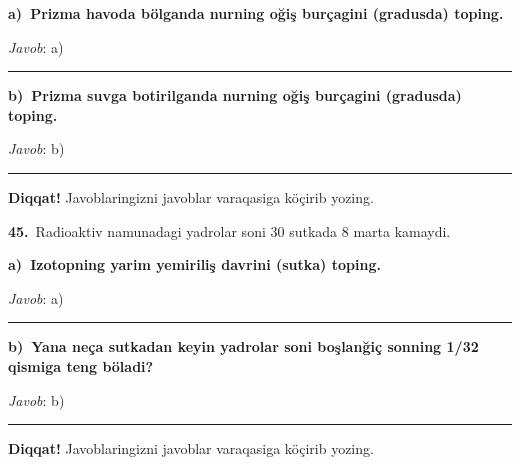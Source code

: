 \documentclass[11pt,a4paper]{article}
\newcommand{\blank}{\rule{5cm}{0.4pt}}
\begin{document}
\medskip\noindent\textbf{a)\ Prizma havoda bölganda nurning oğiş burçagini (gradusda) toping.}\par
\noindent\textit{Javob}: a)\ \blank\par
\medskip\noindent\textbf{b)\ Prizma suvga botirilganda nurning oğiş burçagini (gradusda) toping.}\par
\noindent\textit{Javob}: b)\ \blank\par
\medskip\noindent\textbf{Diqqat!} Javoblaringizni javoblar varaqasiga köçirib yozing.\par\vspace{10pt}
\noindent\textbf{45.}\ Radioaktiv namunadagi yadrolar soni 30 sutkada 8 marta kamaydi.\par\smallskip
\medskip\noindent\textbf{a)\ Izotopning yarim yemiriliş davrini (sutka) toping.}\par
\noindent\textit{Javob}: a)\ \blank\par
\medskip\noindent\textbf{b)\ Yana neça sutkadan keyin yadrolar soni boşlanğiç sonning 1/32 qismiga teng böladi?}\par
\noindent\textit{Javob}: b)\ \blank\par
\medskip\noindent\textbf{Diqqat!} Javoblaringizni javoblar varaqasiga köçirib yozing.\par\vspace{10pt}
\end{document}

